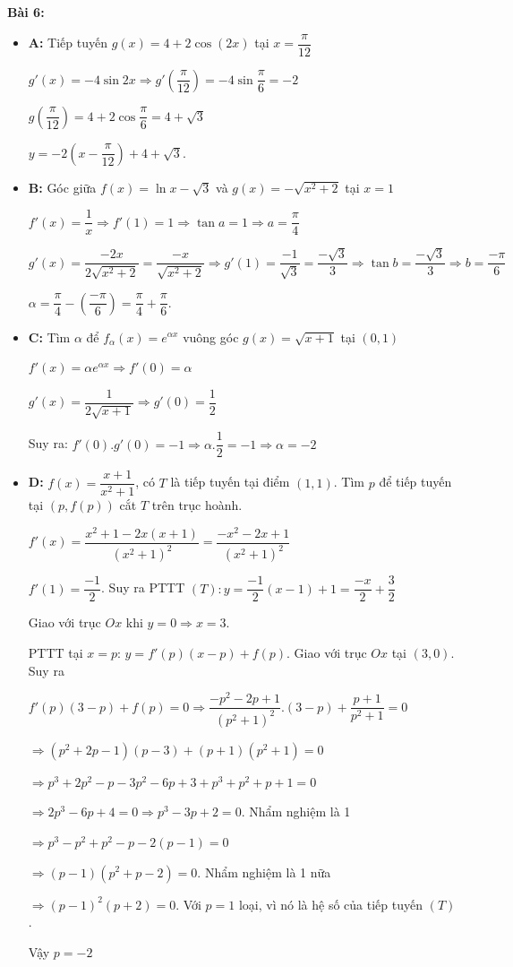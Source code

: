 \documentclass[12pt,a4paper]{article}
\begin{document}
\textbf{Bài 6:}
\begin{itemize}
    \item \textbf{A:} Tiếp tuyến $g(x)=4+2\cos(2x)$ tại $x=\dfrac{\pi}{12}$

    $g'(x) = -4\sin 2x \Rightarrow g'(\dfrac{\pi}{12}) = -4\sin \dfrac{\pi}{6} = -2$

    $g(\dfrac{\pi}{12}) = 4 + 2\cos \dfrac{\pi}{6} = 4 + \sqrt{3}$
    
    $y=-2(x-\dfrac{\pi}{12})+4+\sqrt{3}$.
    \item \textbf{B:} Góc giữa $f(x)=\ln x-\sqrt{3}$ và $g(x)=-\sqrt{x^2+2}$ tại $x=1$

    $f'(x) = \dfrac{1}{x} \Rightarrow f'(1) = 1 \Rightarrow \tan a = 1 \Rightarrow a = \dfrac{\pi}{4}$

    $g'(x) = \dfrac{-2x}{2\sqrt{x^2 + 2}} = \dfrac{-x}{\sqrt{x^2 + 2}} \Rightarrow g'(1) = \dfrac{-1}{\sqrt{3}} = \dfrac{-\sqrt{3}}{3} \Rightarrow \tan b = \dfrac{-\sqrt{3}}{3} \Rightarrow b = \dfrac{-\pi}{6}$
    
    $\alpha=\dfrac{\pi}{4}-(\dfrac{-\pi}{6}) = \dfrac{\pi}{4} + \dfrac{\pi}{6}$.
    \item \textbf{C:} Tìm $\alpha$ để $f_\alpha(x)=e^{\alpha x}$ vuông góc $g(x)=\sqrt{x+1}$ tại $(0,1)$

    $f'(x) = \alpha e^{\alpha x} \Rightarrow f'(0) = \alpha$

    $g'(x) = \dfrac{1}{2\sqrt{x + 1}} \Rightarrow g'(0) = \dfrac{1}{2}$

    Suy ra: $f'(0).g'(0) = - 1 \Rightarrow \alpha.\dfrac{1}{2} = -1 \Rightarrow \alpha = -2$
    \item \textbf{D:} $f(x)=\dfrac{x+1}{x^2+1}$, có $T$ là tiếp tuyến tại điểm $(1, 1)$. Tìm $p$ để tiếp tuyến tại $(p,f(p))$ cắt $T$ trên trục hoành.

    $f'(x) = \dfrac{x^2 + 1 - 2x(x + 1)}{(x^2 + 1)^2} = \dfrac{-x^2 - 2x + 1}{(x^2 + 1)^2}$

    $f'(1) = \dfrac{-1}{2}$. Suy ra PTTT $(T): y = \dfrac{-1}{2}(x - 1) + 1 = \dfrac{-x}{2} + \dfrac{3}{2}$

    Giao với trục $Ox$ khi $y = 0 \Rightarrow x = 3$.

    PTTT tại $x = p$: $y = f'(p)(x - p) + f(p)$. Giao với trục $Ox$ tại $(3, 0)$. Suy ra

    $f'(p)(3 - p) + f(p) = 0 \Rightarrow \dfrac{-p^2 - 2p + 1}{(p^2 + 1)^2}.(3 - p) + \dfrac{p+1}{p^2+1} = 0$

    $\Rightarrow (p^2 + 2p - 1)(p - 3) + (p + 1)(p^2 + 1) = 0$
    
    $\Rightarrow p^3 + 2p^2 -p-3p^2-6p+3 + p^3+p^2+p+1 = 0$

    $\Rightarrow 2p^3 - 6p + 4 = 0 \Rightarrow p^3 -3p + 2 = 0$. Nhẩm nghiệm là 1

    $\Rightarrow p^3 - p^2 + p^2 - p - 2(p - 1) = 0$

    $\Rightarrow (p - 1)(p^2 + p - 2) = 0$. Nhẩm nghiệm là 1 nữa

    $\Rightarrow (p - 1)^2(p + 2) = 0$. Với $p = 1$ loại, vì nó là hệ số của tiếp tuyến $(T)$.

    Vậy $p=-2$
\end{itemize}
\end{document}
